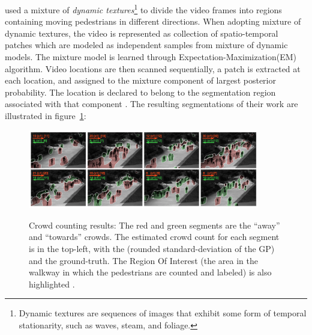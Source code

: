 \citeauthor*{chan2008privacy} used a mixture of \textit{dynamic textures}\footnote{Dynamic textures are sequences of images that exhibit some form of temporal stationarity, such as waves, steam, and foliage.} to divide the video frames into regions containing moving pedestrians in different directions. When adopting mixture of dynamic textures, the video is represented as collection of spatio-temporal patches which are modeled as independent samples from mixture of dynamic models. The mixture model is learned through Expectation-Maximization(EM) algorithm. Video locations are then scanned sequentially, a patch is extracted at each location, and assigned to the mixture component of largest posterior probability. The location is declared to belong to the segmentation region associated with that component  \cite{chan2008privacy}. The resulting segmentations of their work are illustrated in figure~\ref{fig:segUcsd}:
\begin{figure}[H]
	\centering
	{\includegraphics[width=0.9\textwidth]{images/segUcsd}}
	\caption{Crowd counting results: The red and green segments are the “away” and “towards” crowds. The estimated crowd count for each segment is in the top-left, with the (rounded standard-deviation of the GP) and the ground-truth. The Region Of Interest (the area in the walkway in which the pedestrians are counted and labeled) is also highlighted \cite{chan2008privacy}.}
	\label{fig:segUcsd}
\end{figure}

